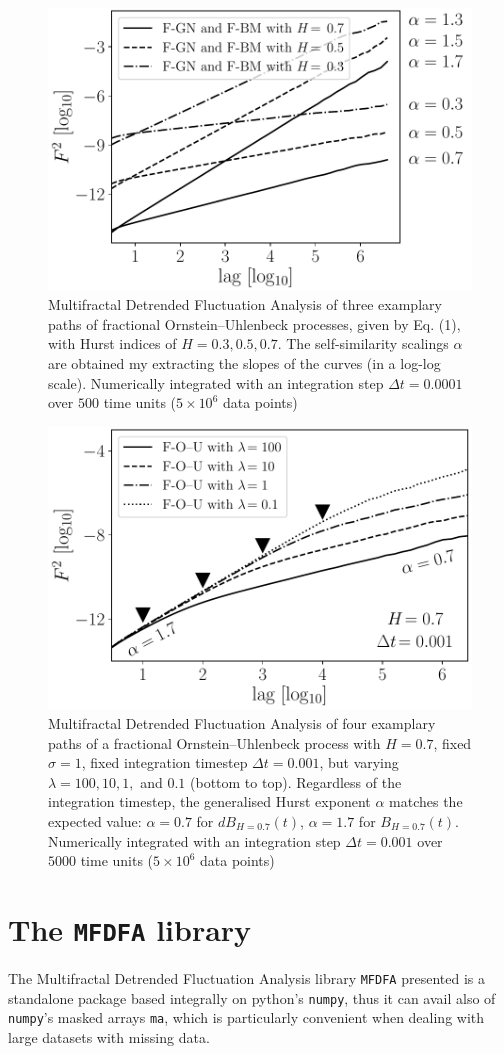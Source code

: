 \documentclass[pre, a4paper, aps, floatfix, superscriptaddress, onecolumn, notitlepage, longbibliography]{revtex4-1} %
\begin{document}
\begin{figure}[h]
  \includegraphics[width = 0.5\linewidth]{fig1.pdf}
  \caption{Multifractal Detrended Fluctuation Analysis of three examplary paths of fractional Ornstein--Uhlenbeck processes, given by Eq. (1),
  with Hurst indices of $H=0.3, 0.5, 0.7$.
  The self-similarity scalings $\alpha$ are obtained my extracting the slopes of the curves (in a log-log scale).
  Numerically integrated with an integration step $\Delta t = 0.0001$ over $500$ time units ($5\times10^6$ data points)}\label{fig:1}
\end{figure}

\begin{figure}[h]
  \includegraphics[width = 0.5\linewidth]{fig2.pdf}
  \caption{Multifractal Detrended Fluctuation Analysis of four examplary paths of a fractional Ornstein--Uhlenbeck process with $H=0.7$, fixed $\sigma = 1$, fixed integration timestep $\Delta t = 0.001$, but varying $\lambda = 100, 10, 1,$ and $0.1$ (bottom to top).
  Regardless of the integration timestep, the generalised Hurst exponent $\alpha$ matches the expected value: $\alpha = 0.7$ for $dB_{H=0.7}(t)$, $\alpha = 1.7$ for $B_{H=0.7}(t)$.
  Numerically integrated with an integration step $\Delta t = 0.001$ over $5000$ time units ($5\times10^6$ data points)}\label{fig:2}
\end{figure}

\section{The \texttt{MFDFA} library}
The Multifractal Detrended Fluctuation Analysis library \texttt{MFDFA} presented is a standalone package based integrally on python's \texttt{numpy}, thus it can avail also of \texttt{numpy}'s masked arrays \texttt{ma}, which is particularly convenient when dealing with large datasets with missing data.
\end{document}
